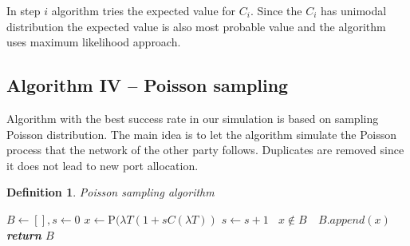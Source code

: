 \documentclass[twoside]{article}
\newtheorem{mydef}{Definition}
\begin{document}
\begin{multicols}{2}
In step $i$ algorithm tries the expected value for $C_i$. Since the $C_i$ has unimodal distribution
the expected value is also most probable value and the algorithm uses maximum likelihood approach.

\subsection{Algorithm IV -- Poisson sampling}
Algorithm with the best success rate in our simulation is based on sampling Poisson distribution.
The main idea is to let the algorithm simulate the Poisson process that the network of the
other party follows. Duplicates are removed since it does not lead to new port allocation.

\begin{mydef}
Poisson sampling algorithm 


\begin{algorithmic}[1]
  \newcommand{\LineIf}[2]{ \State \algorithmicif\ {#1}\ \algorithmicthen\ {#2}}%
    \State $B\gets [], s \gets 0$
      \State $x\gets \text{P}(\lambda T (1+s C(\lambda T))$
      \State $s\gets s+1$
      \LineIf{$x \notin B$}{$B.append(x)$} %
    \EndWhile
    \State \textbf{return} $B$
   \EndFunction\\
    

\end{algorithmic}
\end{mydef}
\end{multicols}
\end{document}
